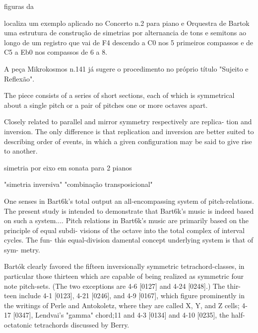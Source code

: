 \documentclass[
	12pt,				%
	openright,			%
	twoside,			%
	a4paper,			%
	english,			%
	french,				%
	spanish,			%
	brazil				%
	]{abntex2}
\begin{document}
figuras da  \cite[p. 187]{bernard1986space}

 localiza um exemplo aplicado no Concerto n.2 para piano e Orquestra de Bartok uma estrutura de construção de simetrias por alternancia de tons e semitons ao longo de um registro que vai de F4 descendo a C0 nos 5 primeiros compassos e de C5 a Eb0 nos compassos de 6 a 8.

A peça Mikrokosmos n.141 já sugere o procedimento no próprio título "Sujeito e Reflexão".

The piece consists of a series of short sections, each of which is symmetrical about a single
pitch or a pair of pitches one or more octaves apart.\cite[p. 187]{bernard1986space}

Closely related to parallel and mirror symmetry respectively are replica-
tion and inversion. The only difference is that replication and inversion are
better suited to describing order of events, in which a given configuration
may be said to give rise to another.\cite[p. 190]{bernard1986space}


simetria por eixo em sonata para 2 pianos \cite[p. 195-198]{bernard1986space}



"simetria inversiva"
"combinação transposicional"
\cite{cohn1988inversional}

One senses in Bart6k's total output an all-encompassing
system of pitch-relations. The present study is intended to demonstrate that
Bart6k's music is indeed based on such a system.... Pitch relations
in Bart6k's music are primarily
based on the principle of equal subdi-
visions of the octave into the total complex of interval cycles. The fun-
this equal-division
damental concept underlying
system is that of sym-
metry.


Bartók clearly favored the fifteen inversionally
symmetric tetrachord-classes, in particular those thirteen which
are capable of being realized as symmetric four note pitch-sets.
(The two exceptions are 4-6 [0127] and 4-24 [0248].) The thir-
teen include 4-1 [0123], 4-21 [0246], and 4-9 [0167], which figure
prominently in the writings of Perle and Antokoletz, where
they are called X, Y, and Z cells; 4-17 [0347], Lendvai's
"gamma" chord;11 and 4-3 [0134] and 4-10 [0235], the half-
octatonic tetrachords discussed by Berry.
\end{document}
